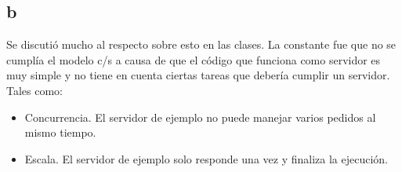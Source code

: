 \documentclass{article}
\begin{document}
	\subsection{b}
	Se discutió mucho al respecto sobre esto en las clases. La constante fue que no se cumplía el modelo c/s a causa de que el código que funciona como servidor es muy simple y no tiene en cuenta ciertas tareas que debería cumplir un servidor.
	Tales como:
	\begin{itemize}
		\item Concurrencia. El servidor de ejemplo no puede manejar varios pedidos al mismo tiempo.
		\item Escala. El servidor de ejemplo solo responde una vez y finaliza la ejecución.
	\end{itemize}
	
\end{document}
